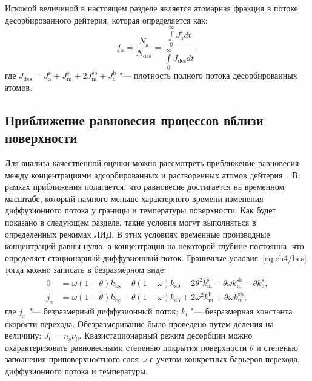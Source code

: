 Искомой величиной в настоящем разделе является атомарная фракция в потоке десорбированного дейтерия, которая определяется как:
\begin{equation}
    f_\mathrm{a} = \dfrac{N_\mathrm{a}}{N_\mathrm{des}}=\dfrac{\int\limits_0^\infty J_\mathrm{a}^\mathrm{s} dt}{\int\limits_0^\infty J_\mathrm{des} dt},
\end{equation}
где $J_\mathrm{des}=J_\mathrm{a}^{\mathrm{s}} + J_\mathrm{m}^{\mathrm{s}} + 2 J_\mathrm{m}^{\mathrm{sb}} + J_\mathrm{a}^{\mathrm{b}}$ "--- плотность полного потока десорбированных атомов.

\subsection{Приближение равновесия процессов вблизи поверхности}\label{subsec:ch4/sec2/subsec2}

Для анализа качественной оценки можно рассмотреть приближение равновесия между концентрациями адсорбированных и растворенных атомов дейтерия~\cite{Kulagin2022a_rus}. В рамках приближения полагается, что равновесие достигается на временном масштабе, который намного меньше характерного времени изменения диффузионного потока у границы и температуры поверхности. Как будет показано в следующем разделе, такие условия могут выполняться в определенных режимах ЛИД. В этих условиях временные производные концентраций равны нулю, а концентрация на некоторой глубине постоянна, что определяет стационарный диффузионный поток. Граничные условия~\cref{eq:ch4/bcs} тогда можно записать в безразмерном виде:
\begin{subequations}
    \begin{align}
        0            & = \omega (1-\theta) k_\mathrm{bs} - \theta (1-\omega) k_\mathrm{sb} - 2\theta^2 k_\mathrm{m}^\mathrm{s} - \theta\omega k_\mathrm{m}^\mathrm{sb} - \theta k_\mathrm{a}^\mathrm{s}, \label{eq:ch4/ss_surface_a} \\
        j_x & = \omega (1-\theta) k_\mathrm{bs} - \theta (1-\omega) k_\mathrm{sb} + 2\omega^2 k_\mathrm{m}^\mathrm{b} +
        \theta\omega k_\mathrm{m}^\mathrm{sb}, \label{eq:ch4/ss_surface_b}
    \end{align}
\end{subequations}
где \( j_x \) "--- безразмерный диффузионный поток; \( k_i \) "--- безразмерная константа скорости перехода. Обезразмеривание было проведено путем деления на величину: \( J_0 = n_\mathrm{s} \nu_0 \). Квазистационарный режим десорбции можно охарактеризовать равновесными степенью покрытия поверхности \( \theta \) и степенью заполнения приповерхностного слоя \( \omega \) с учетом конкретных барьеров перехода, диффузионного потока и температуры.

